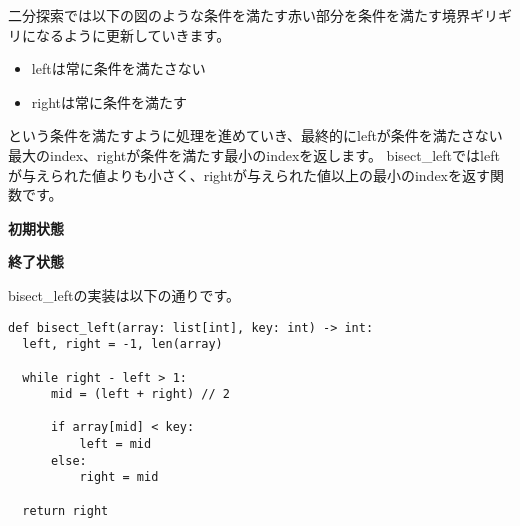 二分探索では以下の図のような条件を満たす赤い部分を条件を満たす境界ギリギリになるように更新していきます。

\begin{itemize}
  \item leftは常に条件を満たさない
  \item rightは常に条件を満たす
\end{itemize}

という条件を満たすように処理を進めていき、最終的にleftが条件を満たさない最大のindex、rightが条件を満たす最小のindexを返します。
bisect\_leftではleftが与えられた値よりも小さく、rightが与えられた値以上の最小のindexを返す関数です。

\vspace{0.5cm}

\begin{center}
\end{center}

\begin{center}
  \textbf{初期状態}
\end{center}

\vspace{0.5cm}

\begin{center}
  \end{center}
  
  \begin{center}
    \textbf{終了状態}
  \end{center}

bisect\_leftの実装は以下の通りです。

\begin{lstlisting}[caption=bisect\_leftの実装, frame=TRBL, label={bisect_left}]
def bisect_left(array: list[int], key: int) -> int:
  left, right = -1, len(array)
  
  while right - left > 1:
      mid = (left + right) // 2
      
      if array[mid] < key:
          left = mid
      else:
          right = mid
  
  return right
\end{lstlisting}

